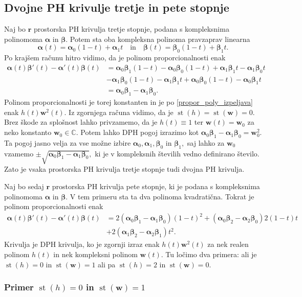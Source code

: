 \documentclass[12pt,a4paper,twoside]{article}
\theoremstyle{definition} %
\theoremstyle{plain} %
\theoremstyle{primerstyle}
\numberwithin{equation}{section}  %
\renewcommand{\C}{\mathbb C}
\newcommand{\rV}{\mathbf{r}}
\newcommand{\wV}{\mathbf{w}}
\newcommand{\balpha}{\boldsymbol \alpha}
\newcommand{\bbeta}{\boldsymbol \beta}
\DeclareMathOperator{\st}{st}
\begin{document}
\subsection{Dvojne PH krivulje tretje in pete stopnje}

Naj bo $\rV$ prostorska PH krivulja tretje stopnje, podana s kompleksnima polinomoma $\balpha$ in $\bbeta.$ Potem sta oba kompleksna polinoma pravzaprav linearna $$\balpha(t)=\balpha_0(1-t)+\balpha_1t\quad\text{in}\quad\bbeta(t)=\bbeta_0(1-t)+\bbeta_1t.$$ Po krajšem računu hitro vidimo, da je polinom proporcionalnosti enak
\begin{align*}
	\balpha(t)\bbeta'(t)-\balpha'(t)\bbeta(t)&=\balpha_0\bbeta_1(1-t)-\balpha_0\bbeta_0(1-t)+\balpha_1\bbeta_1t-\balpha_1\bbeta_0t\\
	&-\balpha_1\bbeta_0(1-t)-\balpha_1\bbeta_1t+\balpha_0\bbeta_0(1-t)-\balpha_0\bbeta_1t\\
	&=\balpha_0\bbeta_1-\balpha_1\bbeta_0.
\end{align*}
Polinom proporcionalnosti je torej konstanten in je po \eqref{propor_poly_izpeljava} enak $h(t)\wV^2(t).$ Iz zgornjega računa vidimo, da je $\st(h)=\st(\wV)=0.$ Brez škode za splošnost lahko privzamemo, da je $h(t)\equiv1$ ter $\wV(t)=\wV_0$ za neko konstanto $\wV_0\in\C.$ Potem lahko DPH pogoj izrazimo kot $\balpha_0\bbeta_1-\balpha_1\bbeta_0=\wV_0^2.$ Ta pogoj jasno velja za vse možne izbire $\balpha_0,\balpha_1,\bbeta_0$ in $\bbeta_1,$ saj lahko za $\wV_0$ vzamemo $\pm\sqrt{\balpha_0\bbeta_1-\balpha_1\bbeta_0},$ ki je v kompleksnih številih vedno definirano število. Zato je vsaka prostorska PH krivulja tretje stopnje tudi dvojna PH krivulja.

Naj bo sedaj $\rV$ prostorska PH krivulja pete stopnje, ki je podana s kompleksnima polinomoma $\balpha$ in $\bbeta.$ V tem primeru sta ta dva polinoma kvadratična. Tokrat je polinom proporcionalnosti enak
\begin{align}
	\balpha(t)\bbeta'(t)-\balpha'(t)\bbeta(t)&=2(\balpha_0\bbeta_1-\balpha_1\bbeta_0)(1-t)^2+(\balpha_0\bbeta_2-\balpha_2\bbeta_0)2(1-t)t\nonumber\\
	&+2(\balpha_1\bbeta_2-\balpha_2\bbeta_1)t^2.\label{propoly_bern_5}
\end{align}
Krivulja je DPH krivulja, ko je zgornji izraz enak $h(t)\wV^2(t)$ za nek realen polinom $h(t)$ in nek kompleksni polinom $\wV(t).$ Tu ločimo dva primera: ali je $\st(h)=0$ in $\st(\wV)=1$ ali pa $\st(h)=2$ in $\st(\wV)=0.$

\subsubsection{Primer \texorpdfstring{$\st(h)=0$}{st(h)=0} in \texorpdfstring{$\st(\wV)=1$}{st(w)=1}}
\end{document}
